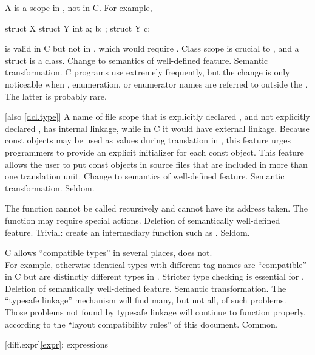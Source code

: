 \change
A  is a scope in \Cpp{}, not in C.
For example,
\begin{codeblock}
struct X {
  struct Y { int a; } b;
};
struct Y c;
\end{codeblock}
is valid in C but not in \Cpp{}, which would require .
\rationale
Class scope is crucial to \Cpp{}, and a struct is a class.
\effect
Change to semantics of well-defined feature.
\difficulty
Semantic transformation.
\howwide
C programs use  extremely frequently, but the
change is only noticeable when , enumeration, or enumerator
names are referred to outside the .
The latter is probably rare.

 [also \ref{dcl.type}]
\change
A name of file scope that is explicitly declared , and not explicitly
declared , has internal linkage, while in C it would have external linkage.
\rationale
Because const objects may be used as values during translation in
\Cpp{}, this feature urges programmers to provide an explicit initializer
for each const object.
This feature allows the user to put const objects in source files that are included
in more than one translation unit.
\effect
Change to semantics of well-defined feature.
\difficulty
Semantic transformation.
\howwide
Seldom.

\change
The  function cannot be called recursively and cannot have its address taken.
\rationale
The  function may require special actions.
\effect
Deletion of semantically well-defined feature.
\difficulty
Trivial: create an intermediary function such as
.
\howwide
Seldom.

\change
C allows ``compatible types'' in several places, \Cpp{} does not.\\
For example,
otherwise-identical  types with different tag names
are ``compatible'' in C but are distinctly different types
in \Cpp{}.
\rationale
Stricter type checking is essential for \Cpp{}.
\effect
Deletion of semantically well-defined feature.
\difficulty
Semantic transformation.
The ``typesafe linkage'' mechanism will find many, but not all,
of such problems.
Those problems not found by typesafe linkage will continue to
function properly,
according to the ``layout compatibility rules'' of this
document.
\howwide
Common.

[diff.expr]{\ref{expr}: expressions}

